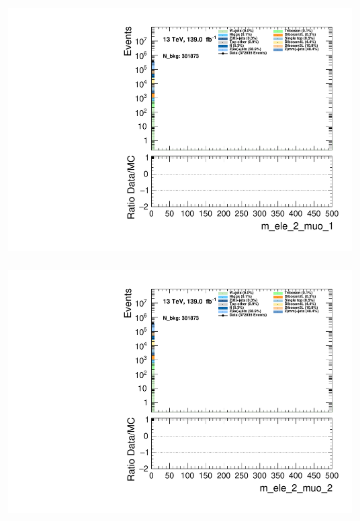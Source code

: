 \begin{figure}
    \centering
    \begin{subfigure}{.49\textwidth}
        \includegraphics[width=\textwidth]{Figures/MC_Data_comp/m_ele_2_muo_1.pdf}
        \caption{}
        \label{fig:et}
    \end{subfigure}
    \hfill
    \begin{subfigure}{.49\textwidth}
        \includegraphics[width=\textwidth]{Figures/MC_Data_comp/m_ele_2_muo_2.pdf}
        \caption{ }
        \label{fig:flcp}
    \end{subfigure}
    \hfill 
    \begin{subfigure}{.49\textwidth}

\end{subfigure}
\end{figure}
